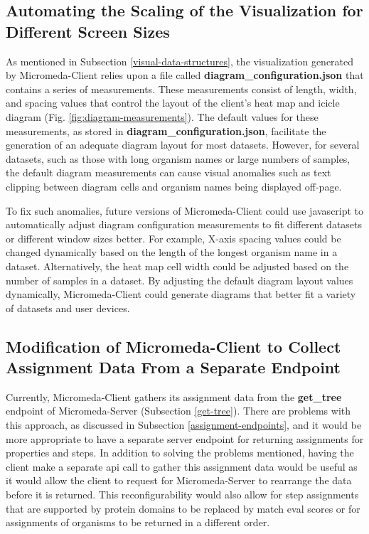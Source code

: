 \subsection{Automating the Scaling of the Visualization for Different Screen Sizes}

As mentioned in Subsection \ref{visual-data-structures}, the visualization generated by Micromeda-Client relies upon a file called \textbf{diagram\_configuration.json} that contains a series of measurements. These measurements consist of length, width, and spacing values that control the layout of the client's heat map and icicle diagram (Fig. \ref{fig:diagram-measurements}). The default values for these measurements, as stored in \textbf{diagram\_configuration.json}, facilitate the generation of an adequate diagram layout for most datasets. However, for several datasets, such as those with long organism names or large numbers of samples, the default diagram measurements can cause visual anomalies such as text clipping between diagram cells and organism names being displayed off-page.

To fix such anomalies, future versions of Micromeda-Client could use \gls{javascript} to automatically adjust diagram configuration measurements to fit different datasets or different window sizes better. For example, X-axis spacing values could be changed dynamically based on the length of the longest organism name in a dataset. Alternatively, the heat map cell width could be adjusted based on the number of samples in a dataset. By adjusting the default diagram layout values dynamically, Micromeda-Client could generate diagrams that better fit a variety of datasets and user devices.

\subsection{Modification of Micromeda-Client to Collect Assignment Data From a Separate Endpoint}

Currently, Micromeda-Client gathers its assignment data from the \textbf{get\_tree} endpoint of Micromeda-Server (Subsection \ref{get-tree}). There are problems with this approach, as discussed in Subsection \ref{assignment-endpoints}, and it would be more appropriate to have a separate server endpoint for returning assignments for properties and steps. In addition to solving the problems mentioned, having the client make a separate \gls{api} call to gather this assignment data would be useful as it would allow the client to request for Micromeda-Server to rearrange the data before it is returned. This reconfigurability would also allow for step assignments that are supported by protein domains to be replaced by match \gls{eval} scores or for assignments of organisms to be returned in a different order.

